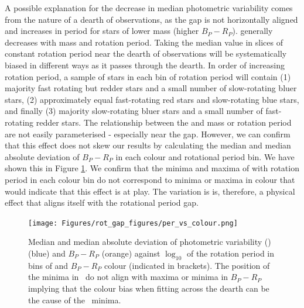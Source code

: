 A possible explanation for the decrease in median photometric variability comes from the nature of a dearth of observations, as the gap is not horizontally aligned and increases in period for stars of lower mass (higher $B_P-R_P$).
\rper{} generally decreases with mass and rotation period.
Taking the median value in slices of constant rotation period near the dearth of observations will be systematically biased in different ways as it passes through the dearth.
In order of increasing rotation period, a sample of stars in each bin of rotation period will contain (1) majority fast rotating but redder stars and a small number of slow-rotating bluer stars, (2) approximately equal fast-rotating red stars and slow-rotating blue stars, and finally (3) majority slow-rotating bluer stars and a small number of fast-rotating redder stars.
The relationship between the \rper{} and mass or rotation period are not easily parameterised - especially near the gap.
However, we can confirm that this effect does not skew our results by calculating the median and median absolute deviation of $B_P-R_P$ in each colour and rotational period bin.
We have shown this in Figure \ref{fig:colour_rper}.
We confirm that the minima and maxima of \rper{} with rotation period in each colour bin do not correspond to minima or maxima in colour that would indicate that this effect is at play.
The variation is \rper{} is, therefore, a physical effect that aligns itself with the rotational period gap.

\begin{figure}
\centering
  \texttt{[image: Figures/rot\_gap\_figures/per\_vs\_colour.png]}
  \caption[Median and median absolute deviation of photometric variability (\rper{}) (blue) and $B_P-R_P$ (orange) against $\log_{10}$ of the rotation period in bins of and \gaia{} $B_P-R_P$ colour.]{
  Median and median absolute deviation of photometric variability (\rper{}) (blue) and $B_P-R_P$ (orange) against $\log_{10}$ of the rotation period in bins of and \gaia{} $B_P-R_P$ colour (indicated in brackets). The position of the minima in \rper{} \ do not align with maxima or minima in $B_P-R_P$ implying that the colour bias when fitting across the dearth can be the cause of the \rper{} \ minima.}
  \label{fig:colour_rper}
\end{figure}


